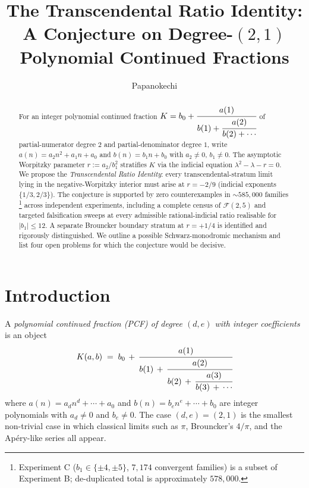 \documentclass[11pt]{amsart}
\title[The Transcendental Ratio Identity]{The Transcendental Ratio
Identity: A Conjecture on Degree-$(2,1)$ Polynomial Continued Fractions}
\author{Papanokechi}
\theoremstyle{definition}
\theoremstyle{remark}
\newcommand{\FF}{\mathcal{F}}
\begin{document}
\begin{abstract}
For an integer polynomial continued fraction
$K = b_0 + \cfrac{a(1)}{b(1) + \cfrac{a(2)}{b(2) + \cdots}}$
of partial-numerator degree $2$ and partial-denominator degree $1$,
write $a(n) = a_2 n^2 + a_1 n + a_0$ and $b(n) = b_1 n + b_0$ with
$a_2 \ne 0$, $b_1 \ne 0$.  The asymptotic Worpitzky parameter
$r := a_2 / b_1^2$ stratifies $K$ via the indicial equation
$\lambda^2 - \lambda - r = 0$.  We propose the
\emph{Transcendental Ratio Identity}: every transcendental-stratum
limit lying in the negative-Worpitzky interior must arise at
$r = -2/9$ (indicial exponents $\{1/3, 2/3\}$).  The conjecture is
supported by zero counterexamples in $\sim 585{,}000$ families%
\footnote{Experiment C ($b_1 \in \{\pm 4, \pm 5\}$, $7{,}174$
convergent families) is a subset of Experiment B; de-duplicated
total is approximately $578{,}000$.}
across independent experiments, including a complete census of
$\FF(2,5)$ and targeted falsification sweeps at every admissible
rational-indicial ratio realisable for $|b_1| \le 12$.  A separate Brouncker
boundary stratum at $r = +1/4$ is identified and rigorously
distinguished.  We outline a possible Schwarz-monodromic mechanism
and list four open problems for which the conjecture would be
decisive.
\end{abstract}

\maketitle

\section{Introduction}

A \emph{polynomial continued fraction (PCF) of degree $(d, e)$ with
integer coefficients} is an object
\begin{equation}\label{eq:pcf}
  K(a, b) \;=\; b_0 \,+\, \cfrac{a(1)}{b(1) \,+\, \cfrac{a(2)}{b(2)
  \,+\, \cfrac{a(3)}{b(3) \,+\, \cdots}}}
\end{equation}
where
\(
a(n) = a_d n^d + \cdots + a_0
\)
and
\(
b(n) = b_e n^e + \cdots + b_0
\)
are integer polynomials with $a_d \ne 0$ and $b_e \ne 0$.  The case
$(d,e) = (2,1)$ is the smallest non-trivial case in which classical
limits such as $\pi$, Brouncker's $4/\pi$, and the Ap\'ery-like series
all appear.
\end{document}
